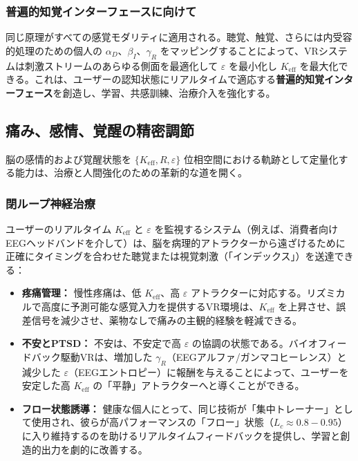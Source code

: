\documentclass[12pt,a4paper]{article}
\begin{document}
	\subsubsection{普遍的知覚インターフェースに向けて}
	同じ原理がすべての感覚モダリティに適用される。聴覚、触覚、さらには内受容的処理のための個人の \(\alpha_D\)、\(\beta_I\)、\(\gamma_R\) をマッピングすることによって、VRシステムは刺激ストリームのあらゆる側面を最適化して \(\varepsilon\) を最小化し \(K_{\mathrm{eff}}\) を最大化できる。これは、ユーザーの認知状態にリアルタイムで適応する\textbf{普遍的知覚インターフェース}を創造し、学習、共感訓練、治療介入を強化する。
	
	\subsection{痛み、感情、覚醒の精密調節}
	
	脳の感情的および覚醒状態を \(\{K_{\mathrm{eff}}, R, \varepsilon\}\) 位相空間における軌跡として定量化する能力は、治療と人間強化のための革新的な道を開く。
	
	\subsubsection{閉ループ神経治療}
	ユーザーのリアルタイム \(K_{\mathrm{eff}}\) と \(\varepsilon\) を監視するシステム（例えば、消費者向けEEGヘッドバンドを介して）は、脳を病理的アトラクターから遠ざけるために正確にタイミングを合わせた聴覚または視覚刺激（「インデックス」）を送達できる：
	\begin{itemize}
		\item \textbf{疼痛管理：} 慢性疼痛は、低 \(K_{\mathrm{eff}}\)、高 \(\varepsilon\) アトラクターに対応する。リズミカルで高度に予測可能な感覚入力を提供するVR環境は、\(K_{\mathrm{eff}}\) を上昇させ、誤差信号を減少させ、薬物なしで痛みの主観的経験を軽減できる。
		\item \textbf{不安とPTSD：} 不安は、不安定で高 \(\varepsilon\) の協調の状態である。バイオフィードバック駆動VRは、増加した \(\gamma_R\)（EEGアルファ/ガンマコヒーレンス）と減少した \(\varepsilon\)（EEGエントロピー）に報酬を与えることによって、ユーザーを安定した高 \(K_{\mathrm{eff}}\) の「平静」アトラクターへと導くことができる。
		\item \textbf{フロー状態誘導：} 健康な個人にとって、同じ技術が「集中トレーナー」として使用され、彼らが高パフォーマンスの「フロー」状態（\(L_c \approx 0.8-0.95\)）に入り維持するのを助けるリアルタイムフィードバックを提供し、学習と創造的出力を劇的に改善する。
	\end{itemize}
	
\end{document}
